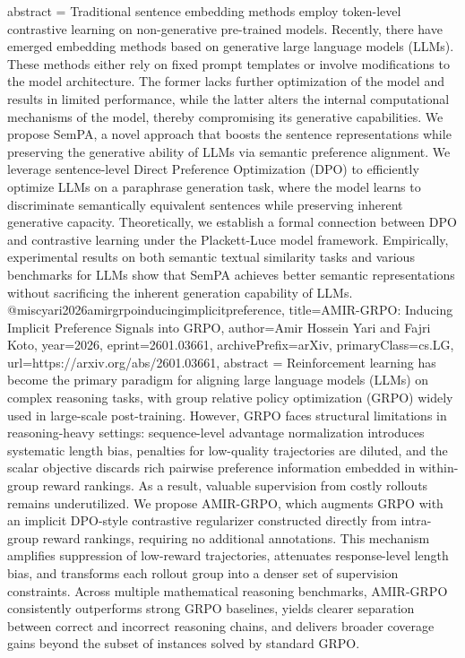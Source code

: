 {      abstract = {Traditional sentence embedding methods employ token-level contrastive learning on non-generative pre-trained models. Recently, there have emerged embedding methods based on generative large language models (LLMs). These methods either rely on fixed prompt templates or involve modifications to the model architecture. The former lacks further optimization of the model and results in limited performance, while the latter alters the internal computational mechanisms of the model, thereby compromising its generative capabilities. We propose SemPA, a novel approach that boosts the sentence representations while preserving the generative ability of LLMs via semantic preference alignment. We leverage sentence-level Direct Preference Optimization (DPO) to efficiently optimize LLMs on a paraphrase generation task, where the model learns to discriminate semantically equivalent sentences while preserving inherent generative capacity. Theoretically, we establish a formal connection between DPO and contrastive learning under the Plackett-Luce model framework. Empirically, experimental results on both semantic textual similarity tasks and various benchmarks for LLMs show that SemPA achieves better semantic representations without sacrificing the inherent generation capability of LLMs.}
}@misc{yari2026amirgrpoinducingimplicitpreference,
      title={AMIR-GRPO: Inducing Implicit Preference Signals into GRPO}, 
      author={Amir Hossein Yari and Fajri Koto},
      year={2026},
      eprint={2601.03661},
      archivePrefix={arXiv},
      primaryClass={cs.LG},
      url={https://arxiv.org/abs/2601.03661},
      abstract = {Reinforcement learning has become the primary paradigm for aligning large language models (LLMs) on complex reasoning tasks, with group relative policy optimization (GRPO) widely used in large-scale post-training. However, GRPO faces structural limitations in reasoning-heavy settings: sequence-level advantage normalization introduces systematic length bias, penalties for low-quality trajectories are diluted, and the scalar objective discards rich pairwise preference information embedded in within-group reward rankings. As a result, valuable supervision from costly rollouts remains underutilized.   We propose AMIR-GRPO, which augments GRPO with an implicit DPO-style contrastive regularizer constructed directly from intra-group reward rankings, requiring no additional annotations. This mechanism amplifies suppression of low-reward trajectories, attenuates response-level length bias, and transforms each rollout group into a denser set of supervision constraints. Across multiple mathematical reasoning benchmarks, AMIR-GRPO consistently outperforms strong GRPO baselines, yields clearer separation between correct and incorrect reasoning chains, and delivers broader coverage gains beyond the subset of instances solved by standard GRPO.}
}

